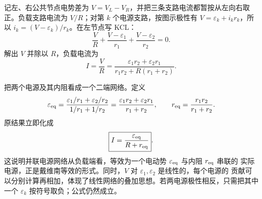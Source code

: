 \begin{xesolution}
记左、右公共节点电势差为 $V=V_L-V_R$，并把三条支路电流都暂按从左向右取正。负载支路电流为
$V/R$；对第 $k$ 个电源支路，按图示极性有 $V=\varepsilon_k+i_kr_k$，所以
$i_k=(V-\varepsilon_k)/r_k$。在左节点写 KCL：
\[
  \frac VR+\frac{V-\varepsilon_1}{r_1}
  +\frac{V-\varepsilon_2}{r_2}=0.
\]
解出 $V$ 并除以 $R$，负载电流为
\[
  \boxed{I=\frac VR
  =\frac{\varepsilon_1r_2+\varepsilon_2r_1}
  {r_1r_2+R(r_1+r_2)}}.
\]

把两个电源及其内阻看成一个二端网络。定义
\[
  \varepsilon_{\rm eq}
  =\frac{\varepsilon_1/r_1+\varepsilon_2/r_2}{1/r_1+1/r_2}
  =\frac{\varepsilon_1r_2+\varepsilon_2r_1}{r_1+r_2},
  \qquad
  r_{\rm eq}=\frac{r_1r_2}{r_1+r_2}.
\]
原结果立即化成
\[
  \boxed{I=\frac{\varepsilon_{\rm eq}}{R+r_{\rm eq}}}.
\]
这说明并联电源网络从负载端看，等效为一个电动势 $\varepsilon_{\rm eq}$ 与内阻 $r_{\rm eq}$ 串联的
实际电源，正是戴维南等效的形式。同时，$V$ 对 $\varepsilon_1,\varepsilon_2$ 是线性的，每个电源的
贡献可以分别计算再相加，体现了线性网络的叠加思想。若两电源极性相反，只需把其中一个
$\varepsilon_k$ 按符号取负；公式仍然成立。
\end{xesolution}
